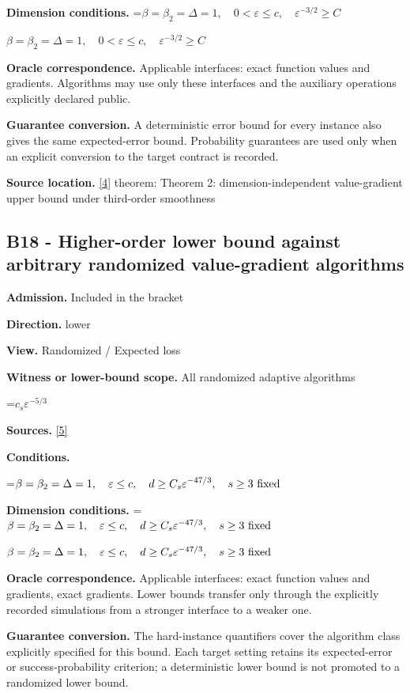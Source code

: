 \documentclass[10pt,a4paper]{article}
\newcommand{\AtlasMath}[1]{\par\begingroup\centering\setbox0=\hbox{$\displaystyle #1$}\ifdim\wd0>1.4\linewidth\typeout{ATLAS WIDE FORMULA: \the\wd0}\fi\ifdim\wd0>\linewidth\resizebox{\linewidth}{!}{\box0}\else\box0\fi\par\endgroup}
\newcommand{\AtlasInlineMath}[1]{\begingroup\setbox0=\hbox{$#1$}\ifdim\wd0>.4\linewidth\endgroup\AtlasMath{#1}\else\endgroup$#1$\fi}
\begin{document}
\textbf{Dimension conditions.} \AtlasInlineMath{\beta=\beta_2=\Delta=1,\quad0<\varepsilon\le c,\quad\varepsilon^{-3/2}\ge C}

\textbf{Oracle correspondence.} Applicable interfaces: exact function values and gradients. Algorithms may use only these interfaces and the auxiliary operations explicitly declared public.

\textbf{Guarantee conversion.} A deterministic error bound for every instance also gives the same expected-error bound. Probability guarantees are used only when an explicit conversion to the target contract is recorded.

\textbf{Source location.} \href{https://proceedings.mlr.press/v70/carmon17a/carmon17a.pdf}{[4]} theorem: Theorem 2: dimension-independent value-gradient upper bound under third-order smoothness

\subsection{B18 - Higher-order lower bound against arbitrary randomized value-gradient algorithms}
\textbf{Admission.} Included in the bracket

\textbf{Direction.} lower

\textbf{View.} Randomized / Expected loss

\textbf{Witness or lower-bound scope.} All randomized adaptive algorithms

\AtlasMath{c_s\varepsilon^{-5/3}}
\textbf{Sources.} \href{https://arxiv.org/pdf/2610.17074v2}{[5]}

\textbf{Conditions.} 
\AtlasMath{\beta=\beta_2=\Delta=1,\quad\varepsilon\le c,\quad d\ge C_s\varepsilon^{-47/3},\quad s\ge3\text{ \text{fixed}}}


\textbf{Dimension conditions.} \AtlasInlineMath{\beta=\beta_2=\Delta=1,\quad\varepsilon\le c,\quad d\ge C_s\varepsilon^{-47/3},\quad s\ge3\text{ \text{fixed}}}

\textbf{Oracle correspondence.} Applicable interfaces: exact function values and gradients, exact gradients. Lower bounds transfer only through the explicitly recorded simulations from a stronger interface to a weaker one.

\textbf{Guarantee conversion.} The hard-instance quantifiers cover the algorithm class explicitly specified for this bound. Each target setting retains its expected-error or success-probability criterion; a deterministic lower bound is not promoted to a randomized lower bound.
\end{document}
